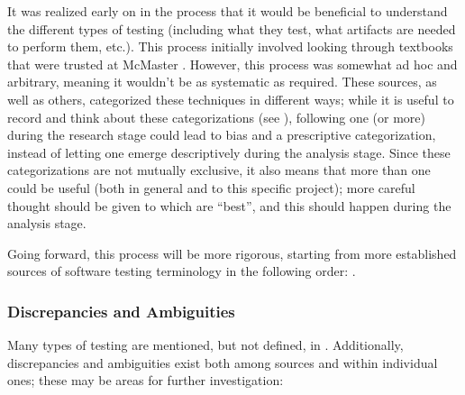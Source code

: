 It was realized early on in the process that it would be beneficial to
understand the different types of testing (including what they test, what
artifacts are needed to perform them, etc.). This process initially involved
looking through textbooks that were trusted at McMaster \citep{Patton2006,
      PetersAndPedrycz2000, vanVliet2000}. However, this process was
somewhat ad hoc and arbitrary, meaning it wouldn't be as systematic as required.
These sources, as well as others, categorized these techniques in different ways;
while it is useful to record and think about these categorizations (see
), following one (or more) during the research
stage could lead to bias and a prescriptive categorization, instead of letting
one emerge descriptively during the analysis stage. Since these categorizations
are not mutually exclusive, it also means that more than one could be useful
(both in general and to this specific project); more careful thought should be
given to which are ``best'', and this should happen during the analysis stage.

Going forward, this process will be more rigorous, starting from more
established sources of software testing terminology in the following order:
\citep{IEEE2022, IEEE2017, IEEE2013, ISO_IEC2023b, IEEE2012, ISO_IEC2023a,
      SWEBOK2024, SWEBOK2014, ISTQB}.

\subsubsection{Discrepancies and Ambiguities}

Many types of testing are mentioned, but not defined, in \citep{IEEE2022}.
Additionally, discrepancies and ambiguities exist both among sources and
within individual ones; these may be areas for further investigation:

